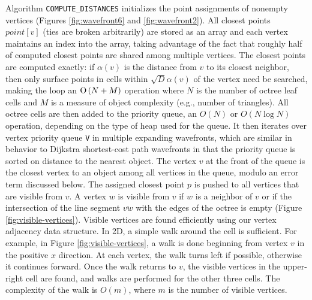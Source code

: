 \documentclass{egpubl}
\begin{document}
Algorithm \texttt{COMPUTE\_DISTANCES} initializes the point assignments of nonempty vertices (Figures \ref{fig:wavefront6} and \ref{fig:wavefront2}). All closest points $point[v]$ (ties are broken arbitrarily) are stored as an array and each vertex maintains an index into the array, taking advantage of the fact that roughly half of computed closest points are shared among multiple vertices.  The closest points are computed exactly: if $\alpha(v)$ is the distance from $v$ to its closest neighbor, then only surface points in cells within $\sqrt{D} \alpha(v)$ of the vertex need be searched, making the loop an $\operatorname{O}\left(N + M\right)$ operation where $N$ is the number of octree leaf cells and $M$ is a measure of object complexity (e.g., number of triangles).  All octree cells are then added to the priority queue, an $O(N)$ or $O(N \log{N})$ operation, depending on the type of heap used for the queue.  It then iterates over vertex priority queue \texttt{V} in multiple expanding wavefronts, which are similar in behavior to Dijkstra shortest-cost path wavefronts in that the priority queue is sorted on distance to the nearest object.  The vertex $v$ at the front of the queue is the closest vertex to an object among all vertices in the queue, modulo an error term discussed below.  The assigned closest point $p$ is pushed to all vertices that are visible from $v$.  A vertex $w$ is visible from $v$ if $w$ is a neighbor of $v$ or if the intersection of the line segment $\overline{vw}$ with the edges of the octree is empty (Figure \ref{fig:visible-vertices}). Visible vertices are found efficiently using our vertex adjacency data structure.  In 2D, a simple walk around the cell is sufficient.  For example, in Figure \ref{fig:visible-vertices}, a walk is done beginning from vertex $v$ in the positive $x$ direction.  At each vertex, the walk turns left if possible, otherwise it continues forward.  Once the walk returns to $v$, the visible vertices in the upper-right cell are found, and walks are performed for the other three cells.  The complexity of the walk is $O(m)$, where $m$ is the number of visible vertices.
\end{document}
